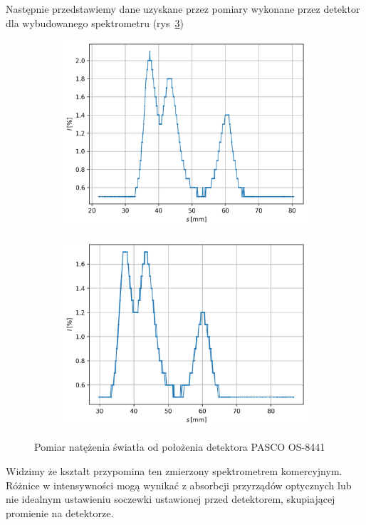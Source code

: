 \documentclass[12pt]{article}
\begin{document}
Następnie przedstawiemy dane uzyskane przez pomiary wykonane przez detektor dla wybudowanego spektrometru (rys~\ref{fig:detektor})
\begin{figure}[H]
	\centering
	\begin{subfigure}{0.45\textwidth}
		\centering
		\includegraphics[width=\linewidth]{detektor0}
        \label{fig:detektor_1}
	\end{subfigure}
	\hfill
	\begin{subfigure}{0.45\textwidth}
		\centering
		\includegraphics[width=\linewidth]{detektor1}
        \label{fig:detektor_2}
    \end{subfigure}
    \caption{Pomiar natężenia światła od położenia detektora PASCO OS-8441}
    \label{fig:detektor}
\end{figure}
Widzimy że kształt przypomina ten zmierzony spektrometrem komercyjnym. Różnice w intensywności mogą wynikać z absorbcji przyrządów optycznych lub nie idealnym ustawieniu soczewki ustawionej przed detektorem, skupiającej promienie na detektorze.
\end{document}
